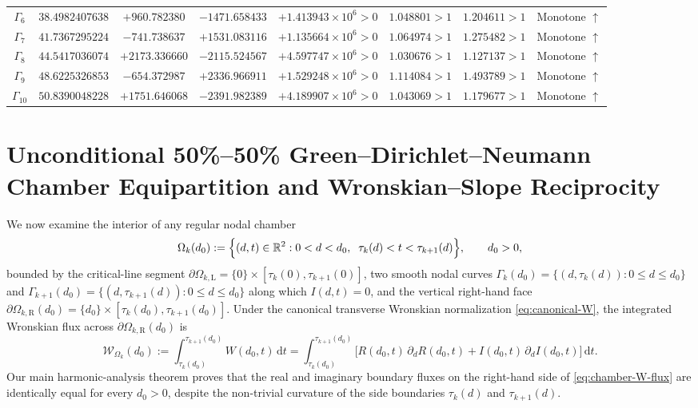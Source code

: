 \documentclass[11pt,reqno]{amsart}
\theoremstyle{definition}
\theoremstyle{remark}
\numberwithin{equation}{section}
\newcommand{\dd}{\mathrm{d}}
\begin{document}
\begin{table}[htbp]
\begin{tabular}{@{}cccccccc@{}}
$\Gamma_6$ & $38.4982407638$ & $+960.782380$ & $-1471.658433$ & $+1.413943 \times 10^6 > 0$ & $1.048801 > 1$ & $1.204611 > 1$ & Monotone $\uparrow$ \\
$\Gamma_7$ & $41.7367295224$ & $-741.738637$ & $+1531.083116$ & $+1.135664 \times 10^6 > 0$ & $1.064974 > 1$ & $1.275482 > 1$ & Monotone $\uparrow$ \\
$\Gamma_8$ & $44.5417036074$ & $+2173.336660$ & $-2115.524567$ & $+4.597747 \times 10^6 > 0$ & $1.030676 > 1$ & $1.127137 > 1$ & Monotone $\uparrow$ \\
$\Gamma_9$ & $48.6225326853$ & $-654.372987$ & $+2336.966911$ & $+1.529248 \times 10^6 > 0$ & $1.114084 > 1$ & $1.493789 > 1$ & Monotone $\uparrow$ \\
$\Gamma_{10}$ & $50.8390048228$ & $+1751.646068$ & $-2391.982389$ & $+4.189907 \times 10^6 > 0$ & $1.043069 > 1$ & $1.179677 > 1$ & Monotone $\uparrow$ \\
\bottomrule
\end{tabular}
\end{table}

\section{Unconditional 50\%--50\% Green--Dirichlet--Neumann Chamber Equipartition and Wronskian--Slope Reciprocity}\label{sec:meso}

We now examine the interior of any regular nodal chamber
\begin{equation}\label{eq:chamber-def}
\Omega_k(d_0) := \Bigl\{(d,t) \in \mathbb{R}^2 : 0 < d < d_0,\;\; \tau_k(d) < t < \tau_{k+1}(d)\Bigr\}, \qquad d_0 > 0,
\end{equation}
bounded by the critical-line segment $\partial\Omega_{k,\mathrm{L}} = \{0\} \times [\tau_k(0),\tau_{k+1}(0)]$, two smooth nodal curves $\Gamma_k(d_0) = \{(d,\tau_k(d)) : 0 \le d \le d_0\}$ and $\Gamma_{k+1}(d_0) = \{(d,\tau_{k+1}(d)) : 0 \le d \le d_0\}$ along which $I(d,t)=0$, and the vertical right-hand face $\partial\Omega_{k,\mathrm{R}}(d_0) = \{d_0\} \times [\tau_k(d_0),\tau_{k+1}(d_0)]$. Under the canonical transverse Wronskian normalization \eqref{eq:canonical-W}, the integrated Wronskian flux across $\partial\Omega_{k,\mathrm{R}}(d_0)$ is
\begin{equation}\label{eq:chamber-W-flux}
\mathcal{W}_{\Omega_k}(d_0) := \int_{\tau_k(d_0)}^{\tau_{k+1}(d_0)} W(d_0,t)\,\dd t = \int_{\tau_k(d_0)}^{\tau_{k+1}(d_0)} \bigl[R(d_0,t)\,\partial_d R(d_0,t) + I(d_0,t)\,\partial_d I(d_0,t)\bigr]\,\dd t.
\end{equation}
Our main harmonic-analysis theorem proves that the real and imaginary boundary fluxes on the right-hand side of \eqref{eq:chamber-W-flux} are identically equal for every $d_0 > 0$, despite the non-trivial curvature of the side boundaries $\tau_k(d)$ and $\tau_{k+1}(d)$.
\end{document}
